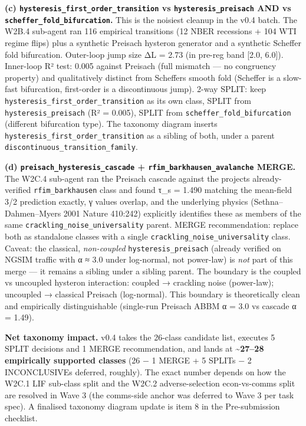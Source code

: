 \documentclass[
  11pt]{article}
\begin{document}
\textbf{(c) \texttt{hysteresis\_first\_order\_transition} vs
\texttt{hysteresis\_preisach} AND vs
\texttt{scheffer\_fold\_bifurcation}.} This is the noisiest cleanup in
the v0.4 batch. The W2B.4 sub-agent ran 116 empirical transitions
(12 NBER recessions + 104 WTI regime flips) plus a synthetic Preisach
hysteron generator and a synthetic Scheffer fold bifurcation.
Outer-loop jump size ΔL = 2.73 (in pre-reg band {[}2.0, 6.0{]}).
Inner-loop R² test: 0.005 against Preisach (full mismatch --- no
congruency property) and qualitatively distinct from Scheffer\textquotesingle s
smooth fold (Scheffer is a slow-fast bifurcation, first-order is a
discontinuous jump). 2-way SPLIT: keep
\texttt{hysteresis\_first\_order\_transition} as its own class, SPLIT
from \texttt{hysteresis\_preisach} (R² = 0.005), SPLIT from
\texttt{scheffer\_fold\_bifurcation} (different bifurcation type). The
taxonomy diagram inserts \texttt{hysteresis\_first\_order\_transition}
as a sibling of both, under a parent
\texttt{discontinuous\_transition\_family}.

\textbf{(d) \texttt{preisach\_hysteresis\_cascade} +
\texttt{rfim\_barkhausen\_avalanche} MERGE.} The W2C.4 sub-agent ran the
Preisach cascade against the project\textquotesingle s already-verified
\texttt{rfim\_barkhausen} class and found τ\_s = 1.490 matching the
mean-field 3/2 prediction exactly, γ values overlap, and the underlying
physics (Sethna--Dahmen--Myers 2001 Nature 410:242) explicitly identifies
these as members of the same \texttt{crackling\_noise\_universality}
parent. MERGE recommendation: replace both as standalone classes with a
single \texttt{crackling\_noise\_universality} class. Caveat: the
classical, \emph{non-coupled} \texttt{hysteresis\_preisach} (already
verified on NGSIM traffic with α ≈ 3.0 under log-normal, not power-law)
is \emph{not} part of this merge --- it remains a sibling under a
sibling parent. The boundary is the coupled vs uncoupled hysteron
interaction: coupled → crackling noise (power-law); uncoupled →
classical Preisach (log-normal). This boundary is theoretically clean
and empirically distinguishable (single-run Preisach ABBM α = 3.0 vs
cascade α = 1.49).

\textbf{Net taxonomy impact.} v0.4 takes the 26-class candidate list,
executes 5 SPLIT decisions and 1 MERGE recommendation, and lands at
\textbf{\textasciitilde 27--28 empirically supported classes}
(26 − 1 MERGE + 5 SPLITs − 2 INCONCLUSIVEs deferred, roughly). The exact
number depends on how the W2C.1 LIF sub-class split and the W2C.2
adverse-selection econ-vs-comms split are resolved in Wave 3 (the
comms-side anchor was deferred to Wave 3 per task spec). A finalised
taxonomy diagram update is item 8 in the Pre-submission checklist.
\end{document}
